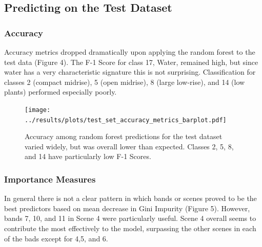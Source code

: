 \documentclass[
]{article}
\begin{document}
\hypertarget{predicting-on-the-test-dataset}{%
\subsection{Predicting on the Test
Dataset}\label{predicting-on-the-test-dataset}}

\hypertarget{accuracy}{%
\subsubsection{Accuracy}\label{accuracy}}

Accuracy metrics dropped dramatically upon applying the random forest to
the test data (Figure 4). The F-1 Score for class 17, Water, remained
high, but since water has a very characteristic signature this is not
surprising. Classification for classes 2 (compact midrise), 5 (open
midrise), 8 (large low-rise), and 14 (low plants) performed especially
poorly.

\begin{figure}
\centering
\texttt{[image: ../results/plots/test\_set\_accuracy\_metrics\_barplot.pdf]}
\caption{Accuracy among random forest predictions for the test dataset
varied widely, but was overall lower than expected. Classes 2, 5, 8, and
14 have particularly low F-1 Scores.}
\end{figure}

\hypertarget{importance-measures}{%
\subsubsection{Importance Measures}\label{importance-measures}}

In general there is not a clear pattern in which bands or scenes proved
to be the best predictors based on mean decrease in Gini Impurity
(Figure 5). However, bands 7, 10, and 11 in Scene 4 were particularly
useful. Scene 4 overall seems to contribute the most effectively to the
model, surpassing the other scenes in each of the bads except for 4,5,
and 6.
\end{document}

